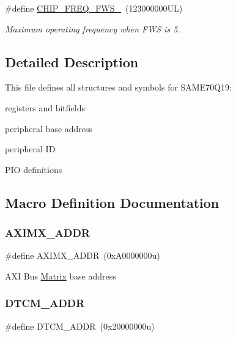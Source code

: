 \begin{DoxyCompactItemize}
\mbox{\label{group__SAME70Q19__definitions_ga3b66824f858591135877b369f98d48a5}} 
\#define \mbox{\hyperlink{group__SAME70Q19__definitions_ga3b66824f858591135877b369f98d48a5}{C\+H\+I\+P\+\_\+\+F\+R\+E\+Q\+\_\+\+F\+W\+S\+\_}}~(123000000\+U\+L)
\begin{DoxyCompactList}\small\item\em Maximum operating frequency when F\+WS is 5. \end{DoxyCompactList}\end{DoxyCompactItemize}


\subsection{Detailed Description}
This file defines all structures and symbols for S\+A\+M\+E70\+Q19\+:
\begin{DoxyItemize}
\item registers and bitfields
\item peripheral base address
\item peripheral ID
\item P\+IO definitions 
\end{DoxyItemize}

\subsection{Macro Definition Documentation}
\mbox{\label{group__SAME70Q19__definitions_ga2fb7cc681bf5e7fbce5e3635b72a330a}} 
\subsubsection{\texorpdfstring{AXIMX\_ADDR}{AXIMX\_ADDR}}
{\footnotesize\ttfamily \#define A\+X\+I\+M\+X\+\_\+\+A\+D\+DR~(0x\+A0000000u)}

A\+XI Bus \mbox{\hyperlink{structMatrix}{Matrix}} base address \mbox{\label{group__SAME70Q19__definitions_ga26626a425f7ebb3a0c2dbc276f0d9f78}} 
\subsubsection{\texorpdfstring{DTCM\_ADDR}{DTCM\_ADDR}}
{\footnotesize\ttfamily \#define D\+T\+C\+M\+\_\+\+A\+D\+DR~(0x20000000u)}

